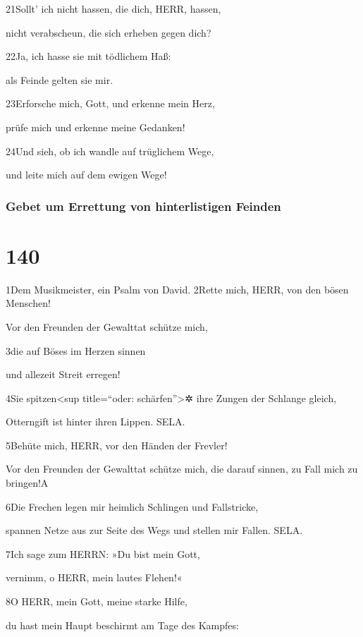 21Sollt' ich nicht hassen, die dich, HERR, hassen,

nicht verabscheun, die sich erheben gegen dich?

22Ja, ich hasse sie mit tödlichem Haß:

als Feinde gelten sie mir.

23Erforsche mich, Gott, und erkenne mein Herz,

prüfe mich und erkenne meine Gedanken!

24Und sieh, ob ich wandle auf trüglichem Wege,

und leite mich auf dem ewigen Wege!

\hypertarget{gebet-um-errettung-von-hinterlistigen-feinden}{%
\subsubsection{Gebet um Errettung von hinterlistigen
Feinden}\label{gebet-um-errettung-von-hinterlistigen-feinden}}

\hypertarget{section-139}{%
\section{140}\label{section-139}}

1Dem Musikmeister, ein Psalm von David. 2Rette mich, HERR, von den bösen
Menschen!

Vor den Freunden der Gewalttat schütze mich,

3die auf Böses im Herzen sinnen

und allezeit Streit erregen!

4Sie spitzen\textless sup title=``oder: schärfen''\textgreater✲ ihre
Zungen der Schlange gleich,

Otterngift ist hinter ihren Lippen. SELA.

5Behüte mich, HERR, vor den Händen der Frevler!

Vor den Freunden der Gewalttat schütze mich, die darauf sinnen, zu Fall
mich zu bringen!{A}

6Die Frechen legen mir heimlich Schlingen und Fallstricke,

spannen Netze aus zur Seite des Wegs und stellen mir Fallen. SELA.

7Ich sage zum HERRN: »Du bist mein Gott,

vernimm, o HERR, mein lautes Flehen!«

8O HERR, mein Gott, meine starke Hilfe,

du hast mein Haupt beschirmt am Tage des Kampfes:

